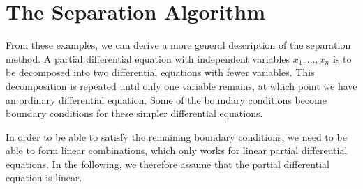 %
%
%
\section{The Separation Algorithm}
From these examples, we can derive a more general description of the
separation method.
A partial differential equation with independent variables
$x_1,\dots,x_n$ is to be decomposed into two
differential equations with fewer variables.
This decomposition is repeated until only one variable remains,
at which point we have an ordinary differential equation.
Some of the boundary conditions become boundary conditions for
these simpler differential equations.

In order to be able to satisfy the remaining boundary conditions,
we need to be able to form linear combinations, which only works
for linear partial differential equations.
In the following, we therefore assume that the partial differential
equation is linear.

